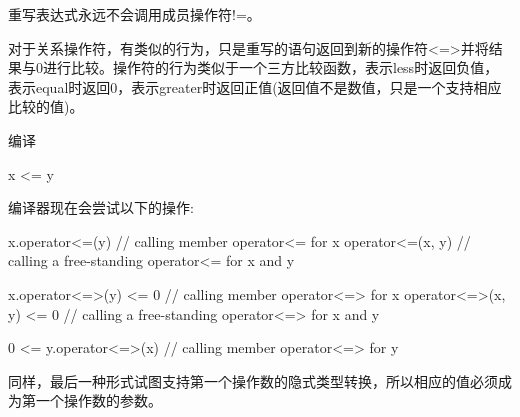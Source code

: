 重写表达式永远不会调用成员操作符!=。


对于关系操作符，有类似的行为，只是重写的语句返回到新的操作符<=>并将结果与0进行比较。操作符的行为类似于一个三方比较函数，表示less时返回负值，表示equal时返回0，表示greater时返回正值(返回值不是数值，只是一个支持相应比较的值)。

编译

\begin{cpp}
x <= y
\end{cpp}

编译器现在会尝试以下的操作:

\begin{cpp}
x.operator<=(y) // calling member operator<= for x
operator<=(x, y) // calling a free-standing operator<= for x and y

x.operator<=>(y) <= 0 // calling member operator<=> for x
operator<=>(x, y) <= 0 // calling a free-standing operator<=> for x and y

0 <= y.operator<=>(x) // calling member operator<=> for y
\end{cpp}

同样，最后一种形式试图支持第一个操作数的隐式类型转换，所以相应的值必须成为第一个操作数的参数。






